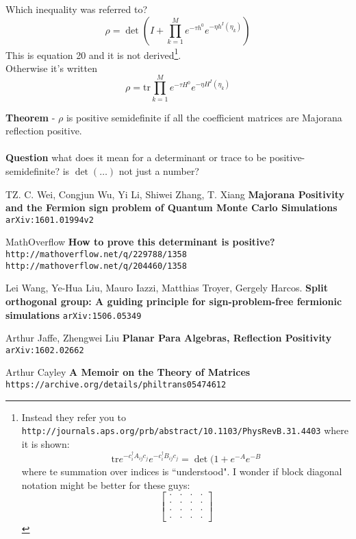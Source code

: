\documentclass[12pt]{article}
\begin{document}
\newpage

\noindent Which inequality was referred to?
$$ \rho = \det \left( I + \prod_{k=1}^M e^{-\tau h^0} e^{-\eta h^I(\eta_k)} \right)$$
This is equation 20 and it is not derived\footnote{  Instead they refer  you to \texttt{http://journals.aps.org/prb/abstract/10.1103/PhysRevB.31.4403} where it is shown:
$$ \mathrm{tr} e^{-c_i^\dagger A_{ij} c_j}
e^{-c_i^\dagger B_{ij} c_j} = \det (1 + e^{-A}e^{-B}$$
where te summation over indices is ``understood".  I wonder if block diagonal notation might be better for these guys:
$$ \left[ \begin{array}{cc|cc} 
 \cdot & \cdot & \cdot & \cdot \\
 \cdot & \cdot & \cdot & \cdot \\ \hline
 \cdot & \cdot & \cdot & \cdot \\
 \cdot & \cdot & \cdot & \cdot  \end{array}\right] $$}. \\ Otherwise it's written
 $$ \rho = \mathrm{tr}
 \prod_{k=1}^M e^{-\tau H^0} e^{-\eta H^I(\eta_k)} 
  $$
 
\noindent \textbf{Theorem} - $\rho$ is positive semidefinite if all the coefficient matrices are Majorana reflection positive. \\ \\
\textbf{Question} what does it mean for a determinant or trace to be positive-semidefinite?  is $\det (\dots)$ not just a number?  
\newpage

\selectfont \fontsize{12}{10}\selectfont

\begin{thebibliography}{}

\item TZ. C. Wei, Congjun Wu, Yi Li, Shiwei Zhang, T. Xiang \textbf{Majorana Positivity and the Fermion sign problem of Quantum Monte Carlo Simulations} \texttt{ arXiv:1601.01994v2}

\item MathOverflow \textbf{How to prove this determinant is positive?}  \\ \texttt{http://mathoverflow.net/q/229788/1358} \\ \texttt{http://mathoverflow.net/q/204460/1358}

\item Lei Wang, Ye-Hua Liu, Mauro Iazzi, Matthias Troyer, Gergely Harcos. \textbf{Split orthogonal group: A guiding principle for sign-problem-free fermionic simulations}
\texttt{arXiv:1506.05349}

\item Arthur Jaffe, Zhengwei Liu \textbf{Planar Para Algebras, Reflection Positivity} \texttt{arXiv:1602.02662} 

\item Arthur Cayley \textbf{A Memoir on the Theory of Matrices} \texttt{https://archive.org/details/philtrans05474612}

\end{thebibliography}
\end{document}
